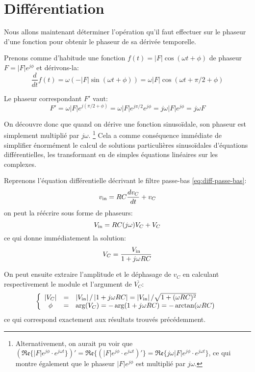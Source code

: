 \section{Différentiation}
\label{sec:phaseurs/diff}

Nous allons maintenant déterminer l'opération qu'il faut effectuer
sur le phaseur d'une fonction pour obtenir le phaseur de sa dérivée temporelle.

Prenons comme d'habitude une fonction $f(t) = |F|\cos(\omega t + \phi)$
de phaseur $F = |F|e^{j\phi}$
et dérivons-la:
\begin{equation}
    \frac{d}{dt}f(t) = \omega (-|F|\sin(\omega t + \phi))
    = \omega |F| \cos(\omega t + \pi/2 + \phi)
\end{equation}

Le phaseur correspondant $F'$ vaut:
\begin{equation}
    F' = \omega |F| e^{j(\pi/2 + \phi)} = \omega |F| e^{j\pi/2} e^{j\phi}
    = j\omega |F| e^{j\phi} = j\omega F
\end{equation}

On découvre donc que quand on dérive une fonction sinusoïdale,
son phaseur est simplement multiplié par $j\omega$.
\footnote{
    Alternativement, on aurait pu voir que
    $(\mathfrak{Re}\{ |F|e^{j\phi} \cdot e^{j\omega t}  \})'
    = \mathfrak{Re}\{(|F|e^{j\phi} \cdot e^{j\omega t})'\}
    = \mathfrak{Re}\{j\omega |F| e^{j\phi} \cdot e^{j\omega t}\}$,
    ce qui montre également que le phaseur $|F|e^{j\phi}$
    est multiplié par $j\omega$.
}
Cela a comme conséquence immédiate de simplifier énormément
le calcul de solutions particulières sinusoïdales d'équations différentielles,
les transformant en de simples équations linéaires sur les complexes.

Reprenons l'équation différentielle décrivant le filtre passe-bas
\eqref{eq:diff-passe-bas}:
\[
    v_{\mathrm{in}} = RC\frac{dv_C}{dt} + v_C
\]
on peut la réécrire sous forme de phaseurs:
\begin{equation}
    V_{\mathrm{in}} = RC(j\omega)V_C + V_C
\end{equation}
ce qui donne immédiatement la solution:
\begin{equation}
    V_C = \frac{V_{\mathrm{in}}}{1 + j\omega RC}
\end{equation}

On peut ensuite extraire l'amplitude et le déphasage de $v_C$
en calculant respectivement le module et l'argument de $\overline{V_C}$:
\begin{equation}
    \left\{
        \begin{array}{ccl}
            |V_C| &=& |V_{\mathrm{in}}|\,/\,|1+j\omega RC|
            = |V_{\mathrm{in}}|\,/\sqrt{1 + (\omega RC)^2} \\
            \phi &=& \arg(V_C) = -\arg(1+j\omega RC)
            = - \arctan(\omega RC)
        \end{array}
    \right.
\end{equation}
ce qui correspond exactement aux résultats trouvés précédemment.

